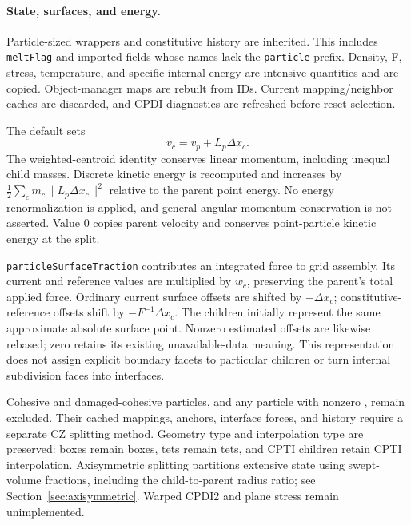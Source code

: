 \paragraph{State, surfaces, and energy.}
Particle-sized wrappers and constitutive history are inherited. This includes
\texttt{meltFlag} and imported fields whose names lack the \texttt{particle}
prefix. Density, F, stress, temperature, and specific internal energy are
intensive quantities and are copied. Object-manager maps are rebuilt from IDs.
Current mapping/neighbor caches are discarded, and CPDI diagnostics are
refreshed before reset selection.

The default  sets
\begin{equation}
 v_c=v_p+L_p\Delta x_c.
\end{equation}
The weighted-centroid identity conserves linear momentum, including unequal
child masses. Discrete kinetic energy is recomputed and increases by
$\tfrac12\sum_c m_c\lVert L_p\Delta x_c\rVert^2$ relative to the parent point
energy. No energy renormalization is applied, and general angular momentum
conservation is not asserted. Value 0 copies parent velocity and conserves
point-particle kinetic energy at the split.

\texttt{particleSurfaceTraction} contributes an integrated force to grid
assembly. Its current and reference values are multiplied by $w_c$, preserving
the parent's total applied force. Ordinary current surface offsets are shifted
by $-\Delta x_c$; constitutive-reference offsets shift by $-F^{-1}\Delta x_c$.
The children initially represent the same approximate absolute surface point.
Nonzero estimated offsets are likewise rebased; zero retains its existing
unavailable-data meaning. This representation does not assign explicit boundary
facets to particular children or turn internal subdivision faces into interfaces.

Cohesive and damaged-cohesive particles, and any particle with nonzero , remain excluded. Their cached mappings, anchors, interface forces, and history require a separate CZ splitting method. Geometry type and interpolation type are preserved: boxes remain boxes, tets remain tets, and CPTI children retain CPTI interpolation. Axisymmetric splitting partitions extensive state using swept-volume fractions, including the child-to-parent radius ratio; see Section~\ref{sec:axisymmetric}. Warped CPDI2 and plane stress remain unimplemented.

